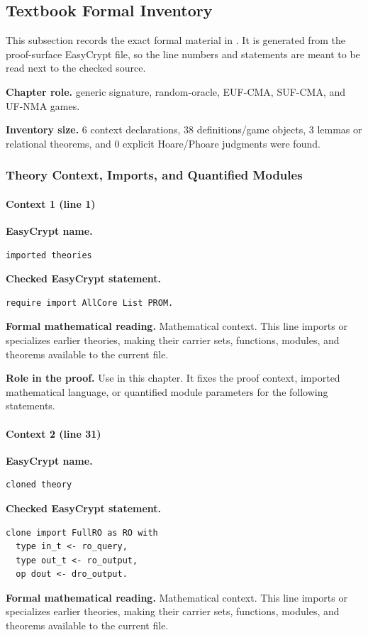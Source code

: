 \subsection*{Textbook Formal Inventory}
This subsection records the exact formal material in .  It is generated from the proof-surface EasyCrypt file, so the line numbers and statements are meant to be read next to the checked source.

\noindent\textbf{Chapter role.} generic signature, random-oracle, EUF-CMA, SUF-CMA, and UF-NMA games.

\noindent\textbf{Inventory size.} 6 context declarations, 38 definitions/game objects, 3 lemmas or relational theorems, and 0 explicit Hoare/Phoare judgments were found.

\subsubsection*{Theory Context, Imports, and Quantified Modules}
\paragraph{Context 1 (line 1)}
\noindent\textbf{EasyCrypt name.}
\begin{lstlisting}[language=EasyCrypt,basicstyle=\ttfamily\scriptsize]
imported theories
\end{lstlisting}
\noindent\textbf{Checked EasyCrypt statement.}
\begin{lstlisting}[language=EasyCrypt,basicstyle=\ttfamily\scriptsize]
require import AllCore List PROM.
\end{lstlisting}
\noindent\textbf{Formal mathematical reading.}
Mathematical context. This line imports or specializes earlier theories, making their carrier sets, functions, modules, and theorems available to the current file.

\noindent\textbf{Role in the proof.}
Use in this chapter. It fixes the proof context, imported mathematical language, or quantified module parameters for the following statements.

\paragraph{Context 2 (line 31)}
\noindent\textbf{EasyCrypt name.}
\begin{lstlisting}[language=EasyCrypt,basicstyle=\ttfamily\scriptsize]
cloned theory
\end{lstlisting}
\noindent\textbf{Checked EasyCrypt statement.}
\begin{lstlisting}[language=EasyCrypt,basicstyle=\ttfamily\scriptsize]
clone import FullRO as RO with
  type in_t <- ro_query,
  type out_t <- ro_output,
  op dout <- dro_output.
\end{lstlisting}
\noindent\textbf{Formal mathematical reading.}
Mathematical context. This line imports or specializes earlier theories, making their carrier sets, functions, modules, and theorems available to the current file.

